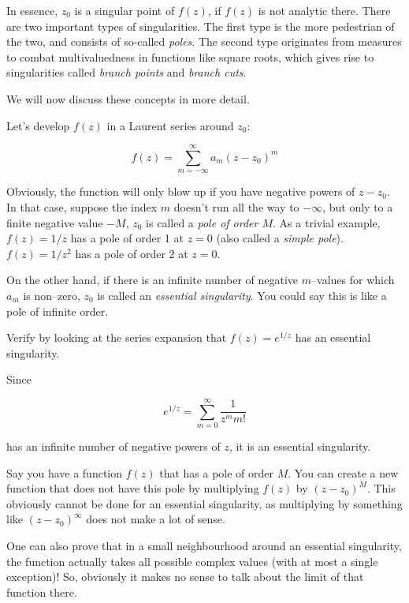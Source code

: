 In essence, $z_0$ is a singular point of $f(z)$, if $f(z)$ is not analytic there. There are two important types of singularities. The first type is the more pedestrian of the two, and consists of so-called \emph{poles}. The second type originates from measures to combat multivaluedness in functions like square roots, which gives rise to singularities called \emph{branch points} and \emph{branch cuts}. 

We will now discuss these concepts in more detail.


Let's develop $f(z)$ in a Laurent series around $z_0$:

\begin{equation}
f(z)= \sum_{m=-\infty}^{\infty} a_m (z-z_0)^m
\end{equation} 

Obviously, the function will only blow up if you have negative powers of $z-z_0$. In that case, suppose the index $m$ doesn't run all the way to $-\infty$, but only to a finite negative value $-M$, $z_0$ is called a \emph{pole of order $M$}. As a trivial example, $f(z)=1/z$ has a pole of order 1 at $z=0$ (also called a \emph{simple pole}). $f(z)=1/z^2$ has a pole of order 2 at $z=0$.

On the other hand, if there is an infinite number of negative $m$--values for which $a_m$ is non--zero, $z_0$ is called an \emph{essential singularity}. You could say this is like a pole of infinite order.

\begin{cue}
  Verify by looking at the series expansion that $f(z)=e^{1/z}$ has an essential singularity.  
\end{cue}

Since

$$e^{1/z} = \sum_{m=0}^{\infty} \frac{1}{z^m m!} $$

has an infinite number of negative powers of $z$, it is an essential singularity.

Say you have a function $f(z)$ that has a pole of order $M$. You can create a new function that does not have this pole by multiplying $f(z)$ by $(z-z_0)^M$. This obviously cannot be done for an essential singularity, as multiplying by something like $(z-z_0)^\infty$ does not make a lot of sense.

\noindent{}One can also prove that in a small neighbourhood around an essential singularity, the function actually takes all possible complex values (with at most a single exception)! So, obviously it makes no sense to talk about the limit of that function there.

